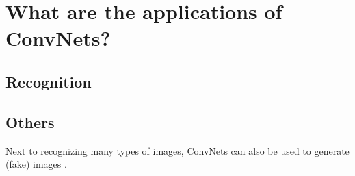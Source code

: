 
\section{What are the applications of ConvNets?}


\subsection{Recognition}


\subsection{Others}



Next to recognizing many types of images, ConvNets can also be used to generate (fake) images \cite{fake}.









